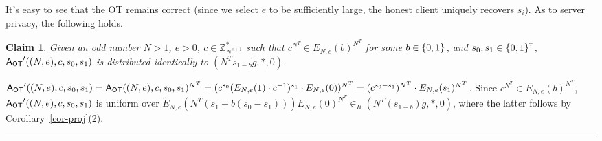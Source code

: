 \documentclass[11pt]{article}
\newtheorem{claim}[theorem]{Claim}
\newenvironment{proof}{\noindent {\bf Proof:} \hspace{.677em}}%
                     {\qed}
\newcommand{\qed}{\hspace*{\fill}\rule{0.6em}{0.6em}}
\newcommand{\ansot}{{\sf A_{OT}}}
\newcommand{\otl}{{\tau}}
\newcommand{\encdj}{{E}_{N,e}}
\newcommand{\encdjnr}{{\tilde{E}}_{N,e}}
\newcommand{\U}[1]{\mathbb{Z}_{#1}^*}
\newcommand\ot{\mbox{OT}\xspace}
\newcommand{\mathify}[1]{\ifmmode{#1}\else\mbox{$#1$}\fi}
\newcommand{\set}[2][]{\mathify{{\left\{#2\right\}}^{#1}}}
\newcommand{\bools}[1][]{\set[#1]{0,1}}
\begin{document}
It's easy to see that the \ot remains correct (since we select $e$ to be sufficiently large,
the honest client uniquely recovers $s_i$). As to server privacy, the following holds.
\begin{claim}
\label{clm-ot-priv-mal-uncond}
Given an odd number $N>1$, $e>0$, $c\in{\U{N^{e+1}}}$ such that $c^{N^T}\in\encdj(b)^{N^T}$ for some $b\in\bools$, and $s_0,s_1\in{\bools[\otl]}$, $\ansot'((N,e),c,s_0,s_1)$ is distributed identically to $(N^Ts_{1-b}\tilde{g},*,0)$.
\end{claim}
\begin{proof}
$\ansot'((N,e),c,s_0,s_1)=\ansot((N,e),c,s_0,s_1)^{N^T}=(c^{s_0}(\encdj(1)\cdot
c^{-1})^{s_1}\cdot\encdj(0))^{N^T}=(c^{s_0-s_1})^{N^T}\cdot\encdj(s_1)^{N^T}$.
Since $c^{N^T}\in\encdj(b)^{N^T}$, $\ansot'((N,e),c,s_0,s_1)$ is
uniform over
$\encdjnr(N^T(s_1+b(s_0-s_1)))\encdj(0)^{N^T}\in_R(N^T(s_{1-b})\tilde{g},*,0)$,
where the latter follows by Corollary~\ref{cor-proj}(2).
\end{proof}
\end{document}
